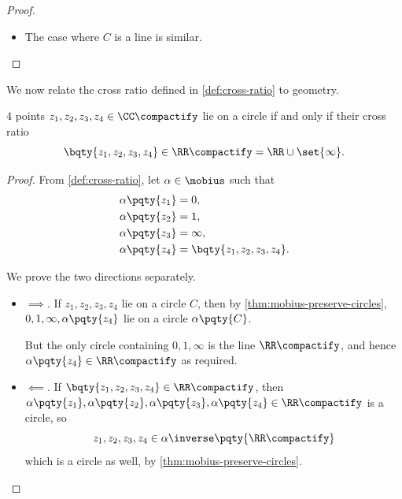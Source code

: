 \begin{proof}
\begin{itemize}
\begin{itemize}
\begin{align*}
                &\iff \abs{z - \frac{\conjugate{c}}{\abs{c}^2 - r^2}}^2 = \frac{\abs{c}^2}{\pqty{\abs{c}^2 - r^2}^2} - \frac{1}{\abs{c}^2 - r^2} \\
                &\iff \abs{z - \frac{\conjugate{c}}{\abs{c}^2 - r^2}}^2 = \frac{r^2}{\pqty{\abs{c}^2 - r^2}^2}
            \end{align*}
            is a Euclidean circle.
        \end{itemize}
        \item The case where \(C\) is a line is similar. 
    \end{itemize}
\end{proof}

We now relate the cross ratio defined in \autoref{def:cross-ratio} to geometry.

\begin{corollary}
    \(4\) points \(z_1, z_2, z_3, z_4 \in \CC\compactify\) lie on a circle if and only if their cross ratio
    \[
        \bqty{z_1, z_2, z_3, z_4} \in \RR\compactify = \RR \cup \set{\infty}.
    \]
\end{corollary}

\begin{proof}
    From \autoref{def:cross-ratio}, let \(\alpha \in \mobius\) such that
    \begin{align*}
        \alpha \pqty{z_1} &= 0, \\
        \alpha \pqty{z_2} &= 1, \\
        \alpha \pqty{z_3} &= \infty, \\
        \alpha \pqty{z_4} &= \bqty{z_1, z_2, z_3, z_4}.
    \end{align*}

    We prove the two directions separately.
    \begin{itemize}
        \item \(\implies\). If \(z_1, z_2, z_3, z_4\) lie on a circle \(C\), then by \autoref{thm:mobius-preserve-circles}, \(0, 1, \infty, \alpha\pqty{z_4}\) lie on a circle \(\alpha\pqty{C}\).
        
        But the only circle containing \(0, 1, \infty\) is the line \(\RR\compactify\), and hence \(\alpha\pqty{z_4} \in \RR\compactify\) as required.

        \item \(\impliedby\). If \(\bqty{z_1, z_2, z_3, z_4} \in \RR\compactify\), then \(\alpha\pqty{z_1}, \alpha\pqty{z_2}, \alpha\pqty{z_3}, \alpha\pqty{z_4} \in \RR\compactify\) is a circle, so
        \[
            z_1, z_2, z_3, z_4 \in \alpha\inverse\pqty{\RR\compactify}
        \]
        which is a circle as well, by \autoref{thm:mobius-preserve-circles}.
    \end{itemize}
\end{proof}